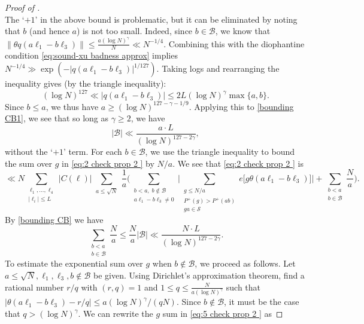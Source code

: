 \documentclass[12pt]{amsart}
\renewcommand{\leq}{\leqslant}
\renewcommand{\geq}{\geqslant}
\numberwithin{equation}{section}
\theoremstyle{plain}
\theoremstyle{definition}
\renewcommand{\l}{\ell}
\newcommand{\CB}{\mathcal{B}}
\newcommand{\CS}{\mathcal{S}}
\begin{document}
\begin{proof}[Proof of ]
\begin{equation}
		\end{equation}
		The `$+1$' in the above bound is problematic, but it can be eliminated by noting that $b$ (and hence $a$) is not too small. Indeed, since $b \in \CB$, we know that $\|\theta q(a\l_1 - b\l_3)\| \leq \frac{a (\log N)^\gamma}{N} \ll N^{-1/4}$. Combining this with the diophantine condition \eqref{eq:sound-xu badness approx} implies $N^{-1/4} \gg \exp(- |q(a \l_1 - b\l_3)|^{1/127}).$ Taking logs and rearranging the inequality gives (by the triangle inequality):
		$$(\log N)^{127} \ll |q(a \l_1-b\l_3)|  \leq 2 L (\log N)^\gamma \max\{a,b\}.$$
		Since $b \leq a$, we thus have $a \geq (\log N)^{127-\gamma - 1/9}.$
		Applying this to \eqref{bounding CB1}, we see that so long as $\gamma \geq 2$, we have
		\begin{equation} \label{bounding CB}
			|\CB| \ll \frac{a \cdot L}{(\log N)^{127 - 2\gamma }},
		\end{equation}
		without the `$+1$' term. For each $b \in \CB$, we use the triangle inequality to bound the sum over $g$ in \eqref{eq:2 check prop 2 } by $N/a$. We see that \eqref{eq:2 check prop 2 } is
		\begin{equation}\label{eq:5 check prop 2 }
			\ll N\sum_{\substack{\l_1,\dots,\l_4 \\ |\l_i| \leq L}} |C(\bm{\l})| \sum_{\substack{a \leq \sqrt{N}}}\frac{1}{a}\bigg(\sum_{\substack{b < a,\; b \not\in \CB \\  a\l_1-b\l_3 \ne 0 }} \bigg| \sum_{\substack{g \leq N/a \\ P^+(g) > P^+(ab) \\ ga \in  \CS}} e\Big[g\theta(a\l_1-b\l_3)\Big] \bigg| +\sum_{\substack{b < a \\ b \in \CB }} \frac{N}{a}   \bigg).
		\end{equation}
		By \eqref{bounding CB} we have
		\begin{equation}\label{eq:6 check prop 2 }
			\sum_{\substack{b < a \\ b \in \CB}} \frac{N}{a}  \leq \frac{N}{a}|\CB| \ll \frac{N\cdot L}{(\log N)^{127 - 2\gamma}}.
		\end{equation}
		To estimate the exponential sum over $g$ when $b \not \in \CB$, we proceed as follows. Let $a \leq \sqrt{N},\l_1,\l_3, b \not \in \CB$ be given. Using Dirichlet's approximation theorem, find a rational number $r/q$ with $(r,q) = 1 $ and $1 \leq q \leq \frac{N}{a(\log N)^{\gamma}}$ such that $|\theta (a\l_1-b\l_3) - r/q| \leq a(\log N)^{\gamma}/(q N)$. Since $b \not \in \CB$, it must be the case that $q > (\log N)^\gamma$. We can rewrite the $g$ sum in \eqref{eq:5 check prop 2 } as

\end{proof}
\end{document}
